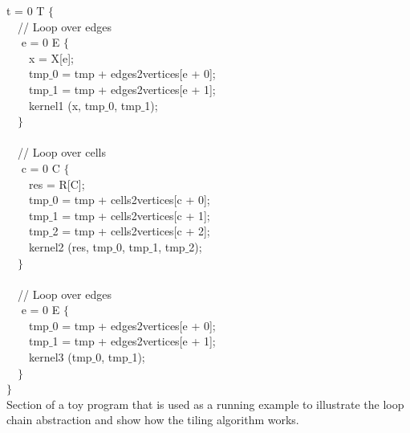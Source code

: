 \begin{algorithm}
\scriptsize\ttfamily
{}

 t = 0  T $\lbrace$\\
~~// Loop over edges\\
~~ e = 0  E $\lbrace$\\
~~~~x = X[e];\\
~~~~tmp$\_$0 = tmp + edges2vertices[e + 0];\\
~~~~tmp$\_$1 = tmp + edges2vertices[e + 1]; \\
~~~~kernel1 (x, tmp$\_0$, tmp$\_$1);\\
~~$\rbrace$\\
~\\
~~// Loop over cells\\
~~ c = 0  C $\lbrace$\\
~~~~res = R[C];\\
~~~~tmp$\_$0 = tmp + cells2vertices[c + 0];\\
~~~~tmp$\_$1 = tmp + cells2vertices[c + 1];\\
~~~~tmp$\_$2 = tmp + cells2vertices[c + 2];\\
~~~~kernel2 (res, tmp$\_0$, tmp$\_$1, tmp$\_$2);\\
~~$\rbrace$\\
~\\
~~// Loop over edges\\
~~ e = 0  E $\lbrace$\\
~~~~tmp$\_$0 = tmp + edges2vertices[e + 0];\\
~~~~tmp$\_$1 = tmp + edges2vertices[e + 1]; \\
~~~~kernel3 (tmp$\_0$, tmp$\_$1);\\
~~$\rbrace$\\
$\rbrace$\\

\caption{Section of a toy program that is used as a running example to illustrate the loop chain abstraction and show how the tiling algorithm works.}
\label{code:tiling-runningexample}
\end{algorithm}


